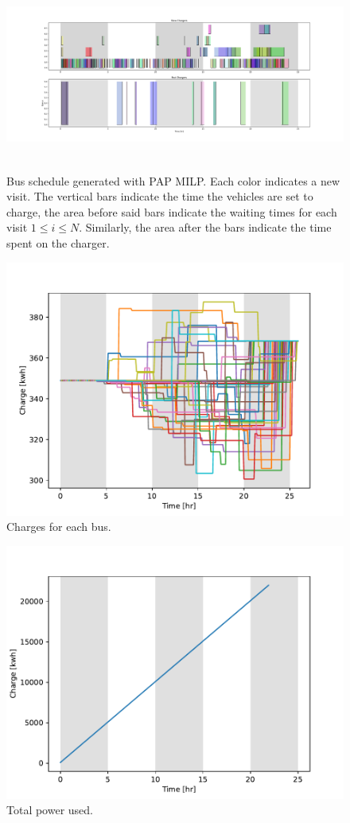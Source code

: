 \documentclass[letterpaper, 10pt, conference]{IEEEtran}
\begin{document}
\begin{figure}[h]
	\centering
	\includegraphics[trim=3in 0in 3in 0in, width=\linewidth, height=2.5in]{schedule.pdf}
	\caption{Bus schedule generated with PAP MILP. Each color indicates a new visit. The vertical bars indicate the time the vehicles are set to charge, the area before said bars indicate the waiting times for each visit \(1 \leq i \leq N\). Similarly, the area after the bars indicate the time spent on the charger.}
	\label{fig:charges}
\end{figure}

\begin{figure}[h]
	\centering
	\includegraphics[trim=0in 0in 0in 0.75in, width=0.75\linewidth]{charges.pdf}
	\caption{Charges for each bus.}
	\label{fig:schedule}
\end{figure}


\begin{figure}[h]
	\centering
	\includegraphics[trim=0in 0in 0in 0.5in, width=0.75\linewidth]{usage.pdf}
	\caption{Total power used.}
	\label{fig:usage}
\end{figure}
\end{document}
